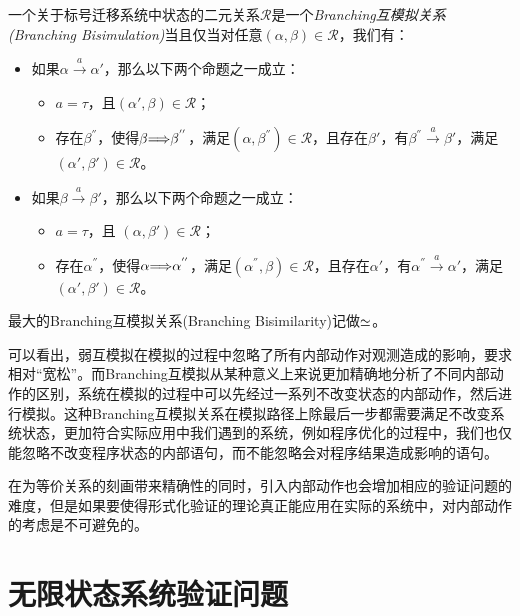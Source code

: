 \begin{defn}\label{def:bra-bis}
一个关于标号迁移系统中状态的二元关系$\mathcal{R}$是一个\emph{Branching互模拟关系(Branching Bisimulation)}当且仅当对任意$(\alpha,\beta)\in \mathcal{R}$，我们有：
\begin{itemize}
    \item 如果$\alpha\stackrel{a}{\longrightarrow}\alpha'$，那么以下两个命题之一成立：
    \begin{itemize}
        \item $a=\tau$，且$(\alpha',\beta)\in\mathcal{R}$；
        \item 存在$\beta^{''}$，使得$\beta{\stackrel{}{\Longrightarrow}}\beta^{''}$，满足$(\alpha,\beta^{''})\in\mathcal{R}$，且存在$\beta'$，有$\beta^{''}\stackrel{a}{\longrightarrow}\beta'$，满足$(\alpha',\beta')\in\mathcal{R}$。
    \end{itemize}
    \item 如果$\beta\stackrel{a}{\longrightarrow}\beta'$，那么以下两个命题之一成立：
    \begin{itemize}
        \item $a=\tau$，且 $(\alpha,\beta')\in\mathcal{R}$；
        \item 存在$\alpha^{''}$，使得$\alpha{\stackrel{}{\Longrightarrow}}\alpha^{''}$，满足$(\alpha^{''},\beta)\in\mathcal{R}$，且存在$\alpha'$，有$\alpha^{''}\stackrel{a}{\longrightarrow}\alpha'$，满足$(\alpha',\beta')\in\mathcal{R}$。
    \end{itemize}
\end{itemize}
最大的Branching互模拟关系(Branching Bisimilarity)记做$\simeq$。
\end{defn}

可以看出，弱互模拟在模拟的过程中忽略了所有内部动作对观测造成的影响，要求相对``宽松''。而Branching互模拟从某种意义上来说更加精确地分析了不同内部动作的区别，系统在模拟的过程中可以先经过一系列不改变状态的内部动作，然后进行模拟。这种Branching互模拟关系在模拟路径上除最后一步都需要满足不改变系统状态，更加符合实际应用中我们遇到的系统，例如程序优化的过程中，我们也仅能忽略不改变程序状态的内部语句，而不能忽略会对程序结果造成影响的语句。

在为等价关系的刻画带来精确性的同时，引入内部动作也会增加相应的验证问题的难度，但是如果要使得形式化验证的理论真正能应用在实际的系统中，对内部动作的考虑是不可避免的。

\section{无限状态系统验证问题}
\label{sec:verfication}


